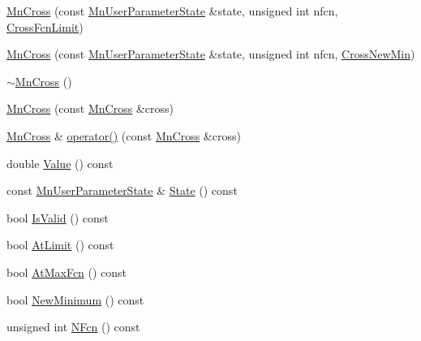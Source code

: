 \begin{DoxyCompactItemize}
\item 
\mbox{\hyperlink{classROOT_1_1Minuit2_1_1MnCross_ad306883aae64c6bd2d4acd8adbb28c9e}{Mn\+Cross}} (const \mbox{\hyperlink{classROOT_1_1Minuit2_1_1MnUserParameterState}{Mn\+User\+Parameter\+State}} \&state, unsigned int nfcn, \mbox{\hyperlink{classROOT_1_1Minuit2_1_1MnCross_1_1CrossFcnLimit}{Cross\+Fcn\+Limit}})
\item 
\mbox{\hyperlink{classROOT_1_1Minuit2_1_1MnCross_a8508fcf20167952cb8f53427d348e2dc}{Mn\+Cross}} (const \mbox{\hyperlink{classROOT_1_1Minuit2_1_1MnUserParameterState}{Mn\+User\+Parameter\+State}} \&state, unsigned int nfcn, \mbox{\hyperlink{classROOT_1_1Minuit2_1_1MnCross_1_1CrossNewMin}{Cross\+New\+Min}})
\item 
\mbox{\hyperlink{classROOT_1_1Minuit2_1_1MnCross_a34f9825f828387bc92e6e7aaac8ced84}{$\sim$\+Mn\+Cross}} ()
\item 
\mbox{\hyperlink{classROOT_1_1Minuit2_1_1MnCross_ac4526685d7655e69378fd2cc844d0e55}{Mn\+Cross}} (const \mbox{\hyperlink{classROOT_1_1Minuit2_1_1MnCross}{Mn\+Cross}} \&cross)
\item 
\mbox{\hyperlink{classROOT_1_1Minuit2_1_1MnCross}{Mn\+Cross}} \& \mbox{\hyperlink{classROOT_1_1Minuit2_1_1MnCross_a12f4058d5a3b758cbaa68a0a9bc0cebb}{operator()}} (const \mbox{\hyperlink{classROOT_1_1Minuit2_1_1MnCross}{Mn\+Cross}} \&cross)
\item 
double \mbox{\hyperlink{classROOT_1_1Minuit2_1_1MnCross_af7cebab3edb3fedaf0e4ce0704e1196f}{Value}} () const
\item 
const \mbox{\hyperlink{classROOT_1_1Minuit2_1_1MnUserParameterState}{Mn\+User\+Parameter\+State}} \& \mbox{\hyperlink{classROOT_1_1Minuit2_1_1MnCross_a97ba8e698ee948a842f0ebe198c0d528}{State}} () const
\item 
bool \mbox{\hyperlink{classROOT_1_1Minuit2_1_1MnCross_a9cee17151ec7e078fc6efbfa32120a1a}{Is\+Valid}} () const
\item 
bool \mbox{\hyperlink{classROOT_1_1Minuit2_1_1MnCross_a01119708c6c9aa2a5b16222705cad954}{At\+Limit}} () const
\item 
bool \mbox{\hyperlink{classROOT_1_1Minuit2_1_1MnCross_a785c82249ecae395a16536cfc64aa610}{At\+Max\+Fcn}} () const
\item 
bool \mbox{\hyperlink{classROOT_1_1Minuit2_1_1MnCross_aaf90f3645fb5fcc67b49ffd24f4a12ba}{New\+Minimum}} () const
\item 
unsigned int \mbox{\hyperlink{classROOT_1_1Minuit2_1_1MnCross_a52cc0559ea27a2d8fe3f9961670e1544}{N\+Fcn}} () const
\end{DoxyCompactItemize}


